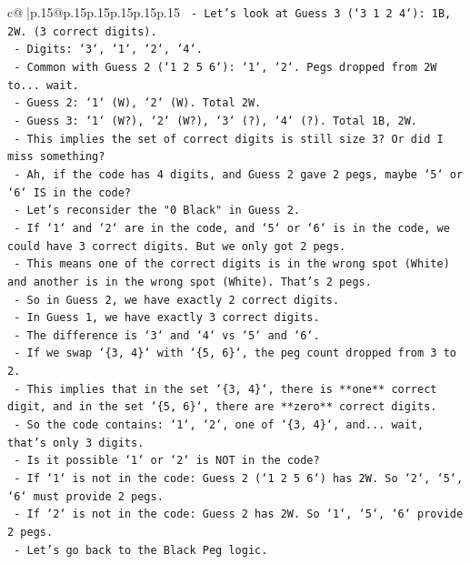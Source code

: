 \documentclass{article}
\begin{document}
{\begin{supertabular}{c@{$\;$}|p{.15\linewidth}@{}p{.15\linewidth}p{.15\linewidth}p{.15\linewidth}p{.15\linewidth}p{.15\linewidth}}
{{{\texttt{    {-} Let's look at Guess 3 (`3 1 2 4`): 1B, 2W. (3 correct digits).} \\
\texttt{    {-} Digits: `3`, `1`, `2`, `4`.} \\
\texttt{    {-} Common with Guess 2 (`1 2 5 6`): `1`, `2`. Pegs dropped from 2W to... wait.} \\
\texttt{    {-} Guess 2: `1` (W), `2` (W). Total 2W.} \\
\texttt{    {-} Guess 3: `1` (W?), `2` (W?), `3` (?), `4` (?). Total 1B, 2W.} \\
\texttt{    {-} This implies the set of correct digits is still size 3? Or did I miss something?} \\
\texttt{    {-} Ah, if the code has 4 digits, and Guess 2 gave 2 pegs, maybe `5` or `6` IS in the code?} \\
\texttt{    {-} Let's reconsider the "0 Black" in Guess 2.} \\
\texttt{    {-} If `1` and `2` are in the code, and `5` or `6` is in the code, we could have 3 correct digits. But we only got 2 pegs.} \\
\texttt{    {-} This means one of the correct digits is in the wrong spot (White) and another is in the wrong spot (White). That's 2 pegs.} \\
\texttt{    {-} So in Guess 2, we have exactly 2 correct digits.} \\
\texttt{    {-} In Guess 1, we have exactly 3 correct digits.} \\
\texttt{    {-} The difference is `3` and `4` vs `5` and `6`.} \\
\texttt{    {-} If we swap `\{3, 4\}` with `\{5, 6\}`, the peg count dropped from 3 to 2.} \\
\texttt{    {-} This implies that in the set `\{3, 4\}`, there is **one** correct digit, and in the set `\{5, 6\}`, there are **zero** correct digits.} \\
\texttt{    {-} So the code contains: `1`, `2`, one of `\{3, 4\}`, and... wait, that's only 3 digits.} \\
\texttt{    {-} Is it possible `1` or `2` is NOT in the code?} \\
\texttt{    {-} If `1` is not in the code: Guess 2 (`1 2 5 6`) has 2W. So `2`, `5`, `6` must provide 2 pegs.} \\
\texttt{    {-} If `2` is not in the code: Guess 2 has 2W. So `1`, `5`, `6` provide 2 pegs.} \\
\texttt{    {-} Let's go back to the Black Peg logic.} \\
}}}
\end{supertabular}}
\end{document}

